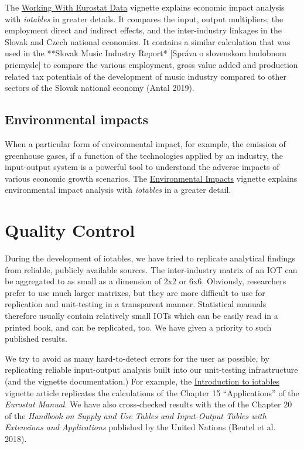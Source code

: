 \documentclass[
]{article}
\begin{document}
The
\href{https://iotables.dataobservatory.eu/articles/working_with_eurostat.html}{Working
With Eurostat Data} vignette explains economic impact analysis with
\emph{iotables} in greater details. It compares the input, output
multipliers, the employment direct and indirect effects, and the
inter-industry linkages in the Slovak and Czech national economies. It
contains a similar calculation that was used in the **Slovak Music
Industry Report* {[}Správa o slovenskom hudobnom priemysle{]} to compare
the various employment, gross value added and production related tax
potentials of the development of music industry compared to other
sectors of the Slovak national economy (Antal 2019).

\hypertarget{environmental-impacts}{%
\subsection{Environmental impacts}\label{environmental-impacts}}

When a particular form of environmental impact, for example, the
emission of greenhouse gases, if a function of the technologies applied
by an industry, the input-output system is a powerful tool to understand
the adverse impacts of various economic growth scenarios. The
\href{https://iotables.dataobservatory.eu/articles/environmental_impact.html}{Environmental
Impacts} vignette explains environmental impact analysis with
\emph{iotables} in a greater detail.

\hypertarget{quality-control}{%
\section{Quality Control}\label{quality-control}}

During the development of iotables, we have tried to replicate
analytical findings from reliable, publicly available sources. The
inter-industry matrix of an IOT can be aggregated to as small as a
dimension of 2x2 or 6x6. Obviously, researchers prefer to use much
larger matrixes, but they are more difficult to use for replication and
unit-testing in a transparent manner. Statistical manuals therefore
usually contain relatively small IOTs which can be easily read in a
printed book, and can be replicated, too. We have given a priority to
such published results.

We try to avoid as many hard-to-detect errors for the user as possible,
by replicating reliable input-output analysis built into our
unit-testing infrastructure (and the vignette documentation.) For
example, the
\href{https://iotables.dataobservatory.eu/articles/intro.html}{Introduction
to iotables} vignette article replicates the calculations of the Chapter
15 ``Applications'' of the \emph{Eurostat Manual}. We have also
cross-checked results with the of the Chapter 20 of the \emph{Handbook
on Supply and Use Tables and Input-Output Tables with Extensions and
Applications} published by the United Nations (Beutel et al. 2018).
\end{document}
